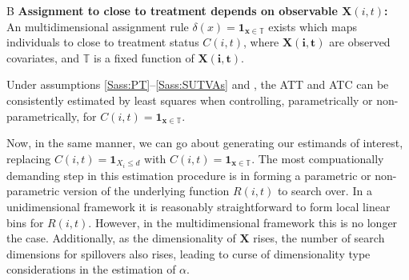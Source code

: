 \begin{assumption}{4}{B}
\label{Sass:SUTVAlM}
\textbf{Assignment to close to treatment depends on observable $\mathbf{X}(i,t)$:} \\ 
An multidimensional assignment rule $\delta(x)=\mathbf{1}_{\mathbf{x}\in \mathbb{T}}$ 
exists which maps individuals to close to treatment status $C(i,t)$, where 
$\mathbf{X(i,t)}$ are observed covariates, and $\mathbb{T}$ is a fixed 
function of $\mathbf{X(i,t)}$.
\end{assumption}

\begin{proposition}
\label{Pass:ATTnonP}
Under assumptions \ref{Sass:PT}--\ref{Sass:SUTVAs} and , 
the ATT and ATC can be consistently estimated by least squares when controlling, 
parametrically or non-parametrically, for $C(i,t)=\mathbf{1}_{\mathbf{x}\in
\mathbb{T}}$. 
\end{proposition}

Now, in the same manner, we can go about generating our estimands of interest, 
replacing $C(i,t)=\mathbf{1}_{X_i\leq d}$ with $C(i,t)=\mathbf{1}_{\mathbf{x}\in 
\mathbb{T}}$. The most compuationally demanding step in this estimation procedure 
is in forming a parametric or non-parametric version of the underlying function 
$R(i,t)$ to search over.  In a unidimensional framework it is reasonably 
straightforward to form local linear bins for $R(i,t)$.  However, in the 
multidimensional framework this is no longer the case.  Additionally, as the 
dimensionality of $\mathbf{X}$ rises, the number of search dimensions for 
spillovers also rises, leading to curse of dimensionality type considerations in 
the estimation of $\alpha$.

